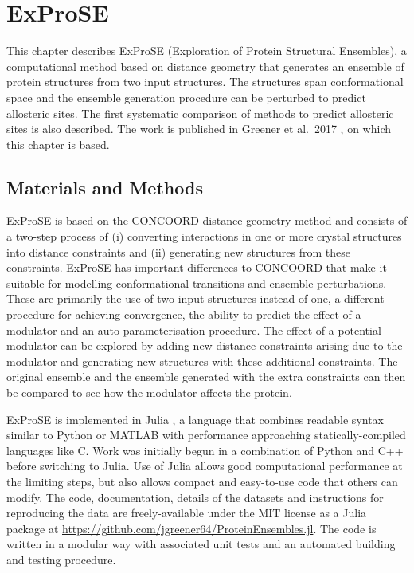 \chapter{ExProSE}
\label{cha:exprose}

This chapter describes ExProSE (Exploration of Protein Structural Ensembles), a computational method based on distance geometry that generates an ensemble of protein structures from two input structures.
The structures span conformational space and the ensemble generation procedure can be perturbed to predict allosteric sites.
The first systematic comparison of methods to predict allosteric sites is also described.
The work is published in Greener et al.\ 2017 \cite{Greener2017}, on which this chapter is based.


\section{Materials and Methods}
\label{sec:exprose_methods}

ExProSE is based on the CONCOORD distance geometry method \cite{DeGroot1997} and consists of a two-step process of (i) converting interactions in one or more crystal structures into distance constraints and (ii) generating new structures from these constraints.
ExProSE has important differences to CONCOORD that make it suitable for modelling conformational transitions and ensemble perturbations.
These are primarily the use of two input structures instead of one, a different procedure for achieving convergence, the ability to predict the effect of a modulator and an auto-parameterisation procedure.
The effect of a potential modulator can be explored by adding new distance constraints arising due to the modulator and generating new structures with these additional constraints. The original ensemble and the ensemble generated with the extra constraints can then be compared to see how the modulator affects the protein.

ExProSE is implemented in Julia \cite{Bezanson2017}, a language that combines readable syntax similar to Python or MATLAB with performance approaching statically-compiled languages like C.
Work was initially begun in a combination of Python and C++ before switching to Julia.
Use of Julia allows good computational performance at the limiting steps, but also allows compact and easy-to-use code that others can modify.
The code, documentation, details of the datasets and instructions for reproducing the data are freely-available under the MIT license as a Julia package at \url{https://github.com/jgreener64/ProteinEnsembles.jl}.
The code is written in a modular way with associated unit tests and an automated building and testing procedure.


